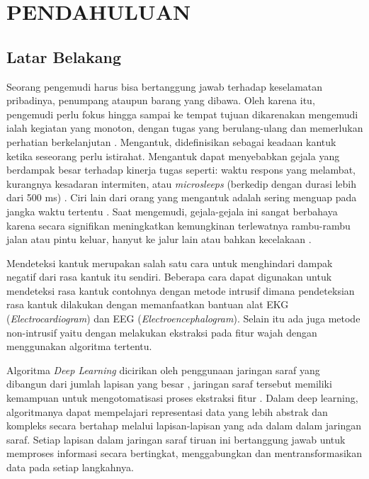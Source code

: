 \chapter{PENDAHULUAN}
\label{chap:pendahuluan}


\section{Latar Belakang}
\label{sec:latarbelakang}

Seorang pengemudi harus bisa bertanggung jawab terhadap
keselamatan pribadinya, penumpang ataupun barang yang dibawa.
Oleh karena itu, pengemudi perlu fokus hingga sampai ke tempat
tujuan dikarenakan mengemudi ialah kegiatan yang monoton, dengan
tugas yang berulang-ulang dan memerlukan perhatian berkelanjutan
\parencite{1}. Mengantuk, didefinisikan sebagai keadaan kantuk
ketika seseorang perlu istirahat. Mengantuk dapat menyebabkan gejala yang
berdampak besar terhadap kinerja tugas seperti: waktu respons
yang melambat, kurangnya kesadaran intermiten, atau \emph{microsleeps}
(berkedip dengan durasi lebih dari 500 ms) \parencite{2}. Ciri
lain dari orang yang mengantuk adalah sering menguap pada jangka
waktu tertentu \parencite{3}. Saat mengemudi, gejala-gejala ini
sangat berbahaya karena secara signifikan meningkatkan kemungkinan
terlewatnya rambu-rambu jalan atau pintu keluar, hanyut ke jalur
lain atau bahkan kecelakaan \parencite{4}.

Mendeteksi kantuk merupakan salah satu cara untuk menghindari
dampak negatif dari rasa kantuk itu sendiri. Beberapa cara dapat
digunakan untuk mendeteksi rasa kantuk contohnya dengan metode
intrusif dimana pendeteksian rasa kantuk dilakukan dengan memanfaatkan
bantuan alat EKG (\emph{Electrocardiogram}) dan EEG (\emph{Electroencephalogram}).
Selain itu ada juga metode non-intrusif yaitu dengan melakukan ekstraksi pada
fitur wajah dengan menggunakan algoritma tertentu.

Algoritma \emph{Deep Learning} dicirikan oleh penggunaan jaringan saraf
yang dibangun dari jumlah lapisan yang besar \parencite{5}, jaringan
saraf tersebut memiliki kemampuan untuk mengotomatisasi proses ekstraksi
fitur \parencite{6}. Dalam deep learning, algoritmanya dapat mempelajari
representasi data yang lebih abstrak dan kompleks secara bertahap melalui
lapisan-lapisan yang ada dalam dalam jaringan saraf. Setiap lapisan dalam
jaringan saraf tiruan ini bertanggung jawab untuk memproses informasi secara
bertingkat, menggabungkan dan mentransformasikan data pada setiap langkahnya.

